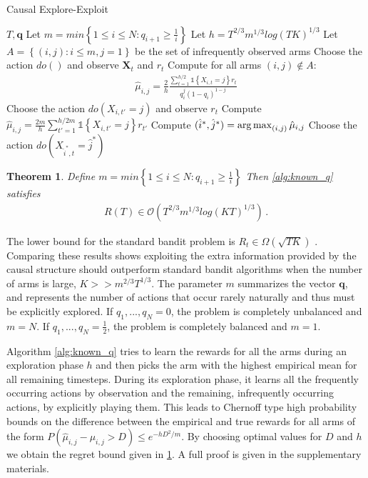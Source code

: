 \documentclass{article}
\newcommand{\set}[1]{\left\{#1\right\}}
\newcommand{\ind}[1]{\mathds{1}\!\!\set{#1}}
\newcommand{\argmax}{\operatornamewithlimits{arg\,max}}
\newcommand{\eq}[1]{\begin{align*}#1\end{align*}}
\newcommand{\bigo}[1]{\mathcal{O}\left( #1 \right)}
\newcommand{\bigomega}[1]{\Omega\left( #1 \right)}
\theoremstyle{plain}
\newtheorem{theorem}{Theorem}
\theoremstyle{definition}
\begin{document}
\begin{algorithm}[h]
   \caption{Causal Explore-Exploit}
   \label{alg:known_q}
\begin{algorithmic}
    $T,\boldsymbol{q}$
   \STATE Let $m =   min\set{1 \leq i \leq N:q_{i+1} \geq \frac{1}{i}}$
   \STATE Let $h = T^{2/3}m^{1/3}log(TK)^{1/3}$
   \STATE Let $A = \set{(i,j) : i \leq m, j = 1}$ be the set of infrequently observed arms
   \STATE Choose the action $do()$ and observe $\boldsymbol{X}_t$ and $r_t$
   \ENDFOR
   \STATE Compute for all arms $(i,j) \notin A$:
   \eq{
   \hat{\mu}_{i,j} = \frac{2}{h}\frac{\sum_{t=1}^{h/2}\ind{X_{i,t}=j}r_t}{q_i^j(1-q_i)^{1-j}}
   }
    \STATE Choose the action $do(X_{i,t'} = j)$ and observe $r_t$
    \ENDFOR
    \STATE Compute $\hat{\mu}_{i,j} = \frac{2m}{h}\sum_{t'=1}^{h/2m}\ind{X_{i,t'} = j}r_{t'}$
   \ENDFOR
   \STATE Compute $(\hat{i}^*,\hat{j}^*) = \argmax_{(i,j)} \hat{\mu}_{i,j}$
   \STATE Choose the action $do(X_{\hat{i}^*,t} = \hat{j}^*)$
   \ENDFOR
\end{algorithmic}
\end{algorithm}

\begin{theorem}\label{thm:known_q_regret}
Define $m =   min\set{1 \leq i \leq N:q_{i+1} \geq \frac{1}{i}}$
Then \cref{alg:known_q} satisfies
\eq{
R(T) \in \bigo{T^{2/3}m^{1/3}log(KT)^{1/3}}\,.
}
\end{theorem}

The lower bound for the standard bandit problem is $R_t \in \bigomega{\sqrt{TK}}$ \cite{Auer1995}. Comparing these results shows exploiting the extra information provided by the causal structure should outperform standard bandit algorithms when the number of arms is large, $K >> m^{2/3}T^{1/3}$. The parameter $m$ summarizes the vector $\boldsymbol{q}$, and represents the number of actions that occur rarely naturally and thus must be explicitly explored. If $q_1,...,q_N = 0$, the problem is completely unbalanced and $m = N$. If $q_1,...,q_N = \frac{1}{2}$, the problem is completely balanced and $m = 1$.

Algorithm \ref{alg:known_q} tries to learn the rewards for all the arms during an exploration phase $h$ and then picks the arm with the highest empirical mean for all remaining timesteps. During its exploration phase, it learns all the frequently occurring actions by observation and the remaining, infrequently occurring actions, by explicitly playing them. This leads to Chernoff type high probability bounds on the difference between the empirical and true rewards for all arms of the form $P(\hat{\mu}_{i,j} - \mu_{i,j} > D) \leq e^{-hD^2/m}$. By choosing optimal values for $D$ and $h$ we obtain the regret bound given in \cref{thm:known_q_regret}. A full proof is given in the supplementary materials. 
\end{document}
